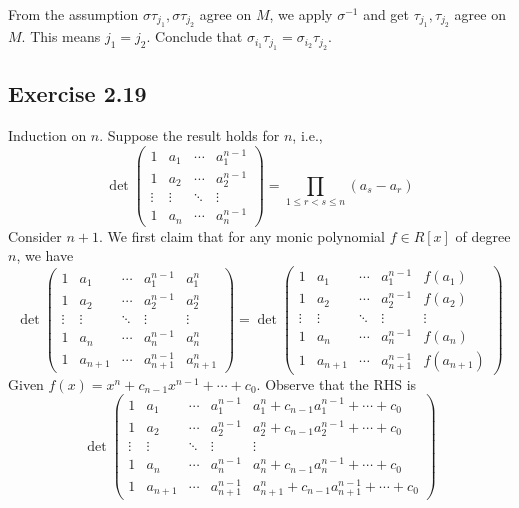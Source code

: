 \documentclass[../Marcus.tex]{subfiles}
\begin{document}
From the assumption $\sigma\tau_{j_1},\sigma\tau_{j_2}$ agree on $M$, we apply $\sigma^{-1}$ and get $\tau_{j_1},\tau_{j_2}$ agree on $M$. This means $j_1=j_2$. Conclude that $\sigma_{i_1}\tau_{j_1}=\sigma_{i_2}\tau_{j_2}$.

\subsection*{Exercise 2.19}

Induction on $n$. Suppose the result holds for $n$, i.e.,
$$
\det\begin{pmatrix}
    1           & a_1      & \cdots & a_1^{n-1} \\
    1           & a_2     & \cdots & a_2^{n-1} \\
    \vdots & \vdots & \ddots & \vdots \\
    1          & a_n      & \cdots & a_n^{n-1}
\end{pmatrix}
=\prod_{1\leq r<s\leq n}(a_s-a_r)
$$
Consider $n+1$. We first claim that for any monic polynomial $f\in R[x]$ of degree $n$, we have
$$
\det\begin{pmatrix}
    1           & a_1       & \cdots & a_1^{n-1}         & a_1^n \\
    1           & a_2       & \cdots & a_2^{n-1}        & a_2^n \\
    \vdots & \vdots   & \ddots & \vdots              & \vdots \\
    1          & a_n        & \cdots & a_n^{n-1}        & a_n^n \\
    1          & a_{n+1} & \cdots & a_{n+1}^{n-1} & a_{n+1}^n
\end{pmatrix}
=
\det\begin{pmatrix}
    1           & a_1        & \cdots & a_1^{n-1}       & f(a_1)\\
    1           & a_2       & \cdots & a_2^{n-1}       & f(a_2) \\
    \vdots & \vdots   & \ddots & \vdots              & \vdots \\
    1          & a_n        & \cdots & a_n^{n-1}        & f(a_n) \\
    1          & a_{n+1} & \cdots & a_{n+1}^{n-1} & f(a_{n+1})
\end{pmatrix}
$$
Given $f(x)=x^n+c_{n-1}x^{n-1}+\cdots+c_0$. Observe that the RHS is
$$
\det\begin{pmatrix}
    1          & a_1         & \cdots & a_1^{n-1}        & a_1^n+c_{n-1}a_1^{n-1}+\cdots+c_0\\
    1          & a_2        & \cdots & a_2^{n-1}        & a_2^n+c_{n-1}a_2^{n-1}+\cdots+c_0 \\
    \vdots & \vdots   & \ddots & \vdots              & \vdots \\
    1          & a_n        & \cdots & a_n^{n-1}        & a_n^n+c_{n-1}a_n^{n-1}+\cdots+c_0 \\
    1          & a_{n+1} & \cdots & a_{n+1}^{n-1} & a_{n+1}^n+c_{n-1}a_{n+1}^{n-1}+\cdots+c_0
\end{pmatrix}
$$
\end{document}

